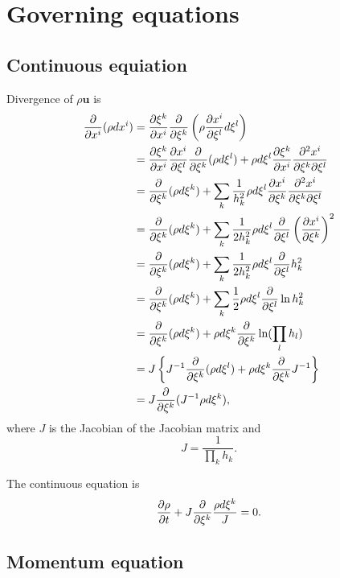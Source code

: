 \documentclass{book}
\begin{document}
\section{Governing equations}

\subsection{Continuous equiation}

Divergence of $\rho \bm{u}$ is
\begin{align}
  \pd{}{x^i}(\rho dx^i)
  &= \pd{\xi^k}{x^i}\pd{}{\xi^k}\left(\rho \pd{x^i}{\xi^l}d\xi^l\right) \nonumber \\
  &= \pd{\xi^k}{x^i}\pd{x^i}{\xi^l}\pd{}{\xi^k}(\rho d\xi^l)
    +\rho d\xi^l \pd{\xi^k}{x^i} \frac{\partial^2 x^i}{\partial \xi^k \partial \xi^l} \nonumber\\
  &= \pd{}{\xi^k} (\rho d\xi^k) + \sum_k\frac{1}{h_k^2}\rho d\xi^l \pd{x^i}{\xi^k}\frac{\partial^2 x^i}{\partial \xi^k \partial \xi^l} \nonumber\\
  &= \pd{}{\xi^k} (\rho d\xi^k) + \sum_k \frac{1}{2h_k^2}\rho d\xi^l \pd{}{\xi^l}\left(\pd{x^i}{\xi^k}\right)^2 \nonumber\\
  &= \pd{}{\xi^k} (\rho d\xi^k) + \sum_k \frac{1}{2h_k^2}\rho d\xi^l \pd{}{\xi^l}h_k^2 \nonumber\\
  &= \pd{}{\xi^k} (\rho d\xi^k) + \sum_k \frac{1}{2}\rho d\xi^l \pd{}{\xi^l}\ln h_k^2 \nonumber\\
  &= \pd{}{\xi^k} (\rho d\xi^k) + \rho d\xi^k \pd{}{\xi^k}\ln (\prod_l h_l) \nonumber\\
  &= J \left\{ J^{-1}\pd{}{\xi^k} (\rho d\xi^l) + \rho d\xi^k \pd{}{\xi^k}J^{-1}\right\} \nonumber\\
  &= J \pd{}{\xi^k} (J^{-1}\rho d\xi^k),
\end{align}
where $J$ is the Jacobian of the Jacobian matrix and
\begin{equation}
  J = \frac{1}{\prod_k h_k}.
\end{equation}

The continuous equation is
\begin{equation}
\pd{\rho}{t} + J \pd{}{\xi^k}\frac{\rho d\xi^k}{J} = 0.
\end{equation}



\subsection{Momentum equation}
\end{document}
